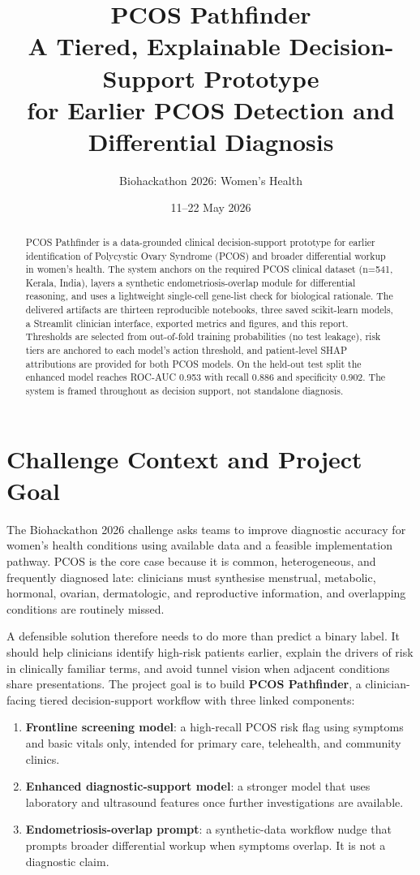 \documentclass[11pt]{article}
\title{\vspace{-1.5em}
\textcolor{accent}{\textbf{PCOS Pathfinder}}\\[0.4em]
\large A Tiered, Explainable Decision-Support Prototype\\
for Earlier PCOS Detection and Differential Diagnosis}
\author{Biohackathon 2026: Women's Health}
\date{11--22 May 2026}
\begin{document}
\maketitle
\thispagestyle{fancy}

\begin{abstract}
\noindent PCOS Pathfinder is a data-grounded clinical decision-support prototype for earlier identification of Polycystic Ovary Syndrome (PCOS) and broader differential workup in women's health. The system anchors on the required PCOS clinical dataset (n=541, Kerala, India), layers a synthetic endometriosis-overlap module for differential reasoning, and uses a lightweight single-cell gene-list check for biological rationale. The delivered artifacts are thirteen reproducible notebooks, three saved scikit-learn models, a Streamlit clinician interface, exported metrics and figures, and this report. Thresholds are selected from out-of-fold training probabilities (no test leakage), risk tiers are anchored to each model's action threshold, and patient-level SHAP attributions are provided for both PCOS models. On the held-out test split the enhanced model reaches ROC-AUC 0.953 with recall 0.886 and specificity 0.902. The system is framed throughout as decision support, not standalone diagnosis.
\end{abstract}

\section{Challenge Context and Project Goal}

The Biohackathon 2026 challenge asks teams to improve diagnostic accuracy for women's health conditions using available data and a feasible implementation pathway. PCOS is the core case because it is common, heterogeneous, and frequently diagnosed late: clinicians must synthesise menstrual, metabolic, hormonal, ovarian, dermatologic, and reproductive information, and overlapping conditions are routinely missed.

A defensible solution therefore needs to do more than predict a binary label. It should help clinicians identify high-risk patients earlier, explain the drivers of risk in clinically familiar terms, and avoid tunnel vision when adjacent conditions share presentations. The project goal is to build \textbf{PCOS Pathfinder}, a clinician-facing tiered decision-support workflow with three linked components:

\begin{enumerate}
  \item \textbf{Frontline screening model}: a high-recall PCOS risk flag using symptoms and basic vitals only, intended for primary care, telehealth, and community clinics.
  \item \textbf{Enhanced diagnostic-support model}: a stronger model that uses laboratory and ultrasound features once further investigations are available.
  \item \textbf{Endometriosis-overlap prompt}: a synthetic-data workflow nudge that prompts broader differential workup when symptoms overlap. It is not a diagnostic claim.
\end{enumerate}
\end{document}
